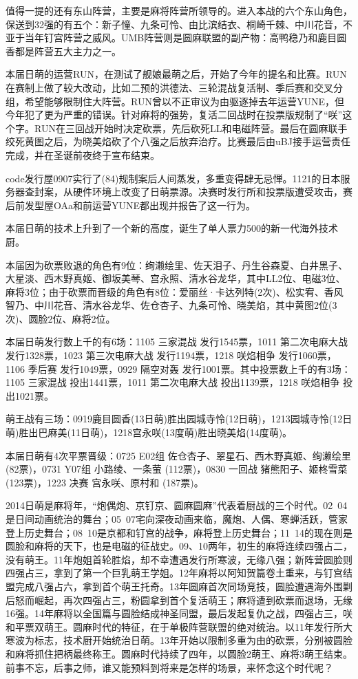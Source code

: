 值得一提的还有东山阵营，主要是麻将阵营所领导的。进入本战的六个东山角色，保送到32强的有五个：新子憧、九条可怜、由比滨结衣、桐崎千棘、中川花音，不亚于当年钉宫阵营之威风。UMB阵营则是圆麻联盟的副产物：高鸭稳乃和鹿目圆香都是阵营五大主力之一。

本届日萌的运营RUN，在测试了舰娘最萌之后，开始了今年的提名和比赛。RUN在赛制上做了较大改动，比如二预的洪德法、三轮混战复活制、季后赛和交叉分组，希望能够限制住大阵营。RUN曾以不正审议为由驱逐掉去年运营YUNE，但今年犯了更为严重的错误。针对麻将的强势，复活二回战时在投票版规制了“咲”这个字。RUN在三回战开始时决定砍票，先后砍死LL和电磁阵营。最后在圆麻联手绞死黄图之后，为晓美焰砍了个八强之后放弃治疗。比赛最后由uBJ接手运营责任完成，并在圣诞前夜终于宣布结束。

code发行屋0907实行了(84)规制案后人间蒸发，多重变得肆无忌惮。1121的日本服务器查封案，从硬件环境上改变了日萌票源。决赛时发行所和投票版遭受攻击，赛后前发型屋OAa和前运营YUNE都出现并报告了这一行为。

本届日萌的技术上升到了一个新的高度，诞生了单人票力500的新一代海外技术厨。

本届因为砍票败退的角色有9位：绚濑绘里、佐天泪子、丹生谷森夏、白井黑子、大星淡、西木野真姬、御坂美琴、宫永照、清水谷龙华，其中LL2位、电磁3位、麻将3位；由于砍票而晋级的角色有8位：爱丽丝·卡达列特(2次)、松实宥、香风智乃、中川花音、清水谷龙华、佐仓杏子、九条可怜、晓美焰，其中黄图2位(3次)、圆脸2位、麻将2位。

本届日萌发行数上千的有6场：1105 三家混战 发行1545票，1011 第二次电麻大战 发行1328票，1023 第三次电麻大战 发行1194票，1218 咲焰相争 发行1060票，1106 季后赛 发行1049票，0929 隔空对轰 发行1001票。其中投票数上千的有3场：1105 三家混战 投出1441票，1011 第二次电麻大战 投出1139票，1218 咲焰相争 投出1021票。

萌王战有三场：0919鹿目圆香(13日萌)胜出园城寺怜(12日萌)，1213园城寺怜(12日萌)胜出巴麻美(11日萌)，1218宫永咲(13度萌)胜出晓美焰(14度萌)。

本届日萌有4次平票晋级：0725 E02组 佐仓杏子、翠星石、西木野真姬、绚濑绘里 (82票)，0731 Y07组 小路绫、一条萤 (112票)，0830 一回战 猪熊阳子、姬柊雪菜 (123票)，1223 决赛 宫永咲、原村和 (187票)。

2014日萌是麻将年，“炮偶炮、京钉京、圆麻圆麻”代表着厨战的三个时代。02~04是日间动画统治的舞台；05~07宅向深夜动画来临，魔炮、人偶、寒蝉活跃，管家登上历史舞台；08~10是京都和钉宫的战争，麻将登上历史舞台；11~14的现在则是圆脸和麻将的天下，也是电磁的征战史。09、10两年，初生的麻将连续四强占二，没有萌王。11年炮姐首轮胜焰，却不幸遭遇发行所寒波，无缘八强；新阵营圆脸则四强占三，拿到了第一个巨乳萌王学姐。12年麻将以阿知贺篇卷土重来，与钉宫结盟完成八强占六，拿到首个萌王托奇。13年圆麻首次同场竞技，圆脸遭遇海外围剿后怒而崛起，再次四强占三，粉圆拿到首个复活萌王；麻将遭到砍票而退场，无缘16强。14年麻将以全国篇与圆脸结成神圣同盟，最后发起复仇之战，四强占三，咲和平票双萌王。圆麻时代的特征，在于单极阵营联盟的绝对统治。以11年发行所大寒波为标志，技术厨开始统治日萌。13年开始以限制多重为由的砍票，分别被圆脸和麻将抓住把柄最终称王。圆麻时代持续了四年，以圆脸2萌王、麻将3萌王结束。前事不忘，后事之师，谁又能预料到将来是怎样的场景，来怀念这个时代呢？

